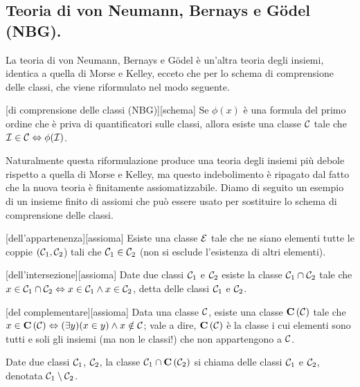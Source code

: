 \subsection{Teoria di von Neumann, Bernays e G\"odel (NBG).}\label{NBG}
\par La teoria di von Neumann, Bernays e G\"odel \`e un'altra teoria degli insiemi, identica a quella di Morse e Kelley, ecceto che per lo schema di comprensione delle classi, che viene riformulato nel modo seguente.
\begin{Axiom}
	[di comprensione delle classi (NBG)][schema] Se $\phi(x)$ \`e una formula del primo ordine che \`e priva di quantificatori sulle classi, allora esiste una classe $\mathcal{C}$ tale che $\mathcal{I} \in \mathcal{C} \Leftrightarrow \phi(\mathcal{I})$.
\end{Axiom}
\par Naturalmente questa riformulazione produce una teoria degli insiemi pi\`u debole rispetto a quella di Morse e Kelley, ma questo indebolimento \`e ripagato dal fatto che la nuova teoria \`e finitamente assiomatizzabile. Diamo di seguito un esempio di un insieme finito di assiomi che pu\`o essere usato per sostituire lo schema di comprensione delle classi.
\begin{Axiom}
	[dell'appartenenza][assioma] Esiste una classe $\mathcal{E}$ tale che ne siano elementi tutte le coppie $(\mathcal{C}_1,\mathcal{C}_2$) tali che $\mathcal{C}_1 \in \mathcal{C}_2$ (non si esclude l'esistenza di altri elementi).
\end{Axiom}
\begin{Axiom}
	[dell'intersezione][assioma] Date due classi $\mathcal{C}_1$ e $\mathcal{C}_2$ esiste la classe $\mathcal{C}_1 \cap \mathcal{C}_2$ tale che $x \in \mathcal{C}_1 \cap \mathcal{C}_2 \Leftrightarrow x \in \mathcal{C}_1 \wedge x \in \mathcal{C}_2$, detta  delle classi $\mathcal{C}_1$ e $\mathcal{C}_2$.
\end{Axiom}
\begin{Axiom}
	[del complementare][assioma] Data una classe $\mathcal{C}$, esiste una classe $\mathbf{C} \left ( \mathcal{C} \right )$ tale che $x \in \mathbf{C} \left ( \mathcal{C} \right ) \Leftrightarrow (\exists y)(x \in y) \wedge x \notin \mathcal{C}$; vale a dire, $\mathbf{C} \left ( \mathcal{C} \right )$ \`e la classe i cui elementi sono tutti e soli gli insiemi (ma non le classi!) che non appartengono a $\mathcal{C}$.
\end{Axiom}
\begin{Definition}
	Date due classi $\mathcal{C}_1$, $\mathcal{C}_2$, la classe $\mathcal{C}_1 \cap \mathbf{C} \left ( \mathcal{C}_2 \right )$ si chiama  delle classi $\mathcal{C}_1$ e $\mathcal{C}_2$, denotata $\mathcal{C}_1 \setminus \mathcal{C}_2$.
\end{Definition}
